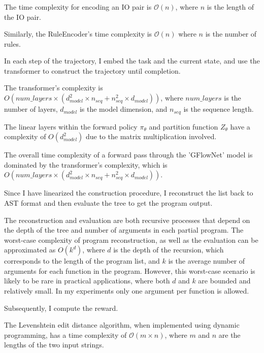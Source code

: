 \subsubsection{}

The time complexity for encoding an IO pair is \(\mathcal{O}(n)\), where \(n\) is the length of the IO pair. 

Similarly, the RuleEncoder's time complexity is \(\mathcal{O}(n)\) where \(n\) is the number of rules.

In each step of the trajectory, I embed the task and the current state, and use the transformer to construct the trajectory until completion. 

The transformer's complexity is \(O(num\_layers \times (d_{model}^2 \times n_{seq} + n_{seq}^2 \times d_{model}))\), where \(num\_layers\) is the number of layers, \(d_{model}\) is the model dimension, and \(n_{seq}\) is the sequence length.

The linear layers within the forward policy $\pi_\theta$ and partition function $Z_\theta$ have a complexity of \(O(d_{model}^2)\) due to the matrix multiplication involved.

The overall time complexity of a forward pass through the 'GFlowNet' model is dominated by the transformer's complexity, which is \(O(num\_layers \times (d_{model}^2 \times n_{seq} + n_{seq}^2 \times d_{model}))\).

Since I have linearized the construction procedure, I reconstruct the list back to AST format and then evaluate the tree to get the program output.

The reconstruction and evaluation are both recursive processes that depend on the depth of the tree and number of arguments in each partial program. 
The worst-case complexity of program reconstruction, as well as the evaluation can be approximated as \(O(k^d)\), where \(d\) is the depth of the recursion, which corresponds to the length of the program list, and \(k\) is the average number of arguments for each function in the program. However, this worst-case scenario is likely to be rare in practical applications, where both \(d\) and \(k\) are bounded and relatively small. In my experiments only one argument per function is allowed.

Subsequently, I compute the reward.

The Levenshtein edit distance algorithm, when implemented using dynamic programming, has a time complexity of 
$\mathcal{O}(m \times n)$, where $m$ and  $n$ are the lengths of the two input strings.


